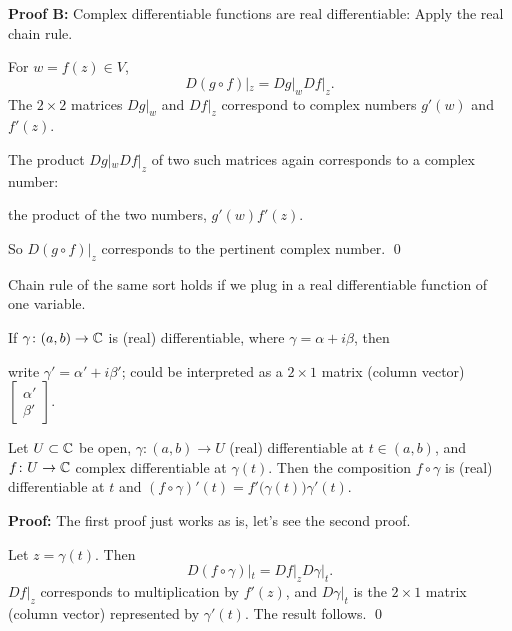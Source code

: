 \documentclass[10pt,aspectratio=169]{beamer}
\begin{document}
\begin{frame}

\textbf{Proof B:}
Complex differentiable functions are real differentiable:
Apply the real chain rule.

\medskip
\pause

For $w = f(z) \in V$,
\[
D(g \circ f)|_z = Dg|_w Df|_z .
\]
\pause
The $2 \times 2$ matrices $Dg|_w$ and $Df|_z$ correspond to complex
numbers $g'(w)$ and $f'(z)$.

\medskip
\pause

The product $Dg|_w Df|_z$ of two such matrices again corresponds to a
complex number:

the product of the two numbers, $g'(w) f'(z)$.

\medskip
\pause

So $D(g \circ f)|_z$ corresponds to the 
pertinent complex number.
\qed
\end{frame}

\begin{frame}
Chain rule of the same sort holds if we plug in a real differentiable function of
one variable.

\medskip
\pause

If $\gamma \colon (a,b) \to {\mathbb{C}}$ is (real) differentiable, where
$\gamma = \alpha + i \beta$, then

\medskip
\pause

write $\gamma' = \alpha' + i \beta'$; could be interpreted as 
a $2 \times 1$ matrix (column vector)
$\left[\begin{smallmatrix}\alpha'\\\beta'\end{smallmatrix}\right]$.

\pause

\begin{proposition}
Let $U \subset {\mathbb{C}}$ be open,
$\gamma \colon (a,b) \to U$ (real) differentiable at $t \in (a,b)$,
and $f \colon U \to {\mathbb{C}}$ complex differentiable at $\gamma(t)$.
Then the composition $f \circ \gamma$ is (real) differentiable
at $t$ and $(f \circ \gamma)'(t) = f'\bigl(\gamma(t)\bigr) \gamma'(t)$.
\end{proposition}

\pause
\textbf{Proof:}
The first proof just works as is, let's see the second proof.

\medskip
\pause

Let $z = \gamma(t)$.  \pause Then 
\[
D(f \circ \gamma)|_{t} =
Df|_z D\gamma|_{t} .
\]
\pause
$Df|_z$ corresponds
to multiplication by $f'(z)$, and $D\gamma|_{t}$
is the $2 \times 1$ matrix (column vector) represented by $\gamma'(t)$.
\pause
The result follows.
\qed
\end{frame}
\end{document}
